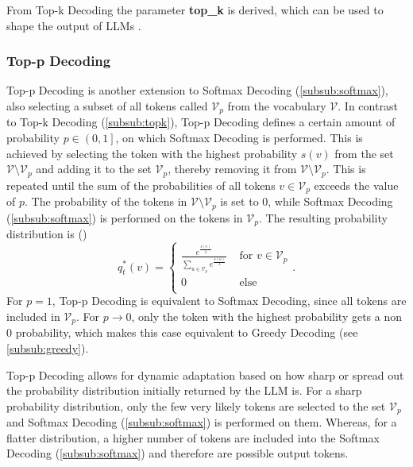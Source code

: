 \documentclass[
	fontsize = 11pt,
	paper = a4,
	draft = false,
	twoside = true,
	titlepage = false
]{scrartcl}
\numberwithin{equation}{subsection}
\begin{document}
	From Top-k Decoding the parameter \textbf{top\_k} is derived, which can be used to shape the output of \gls{LLM}s \autocite[p.~12]{llmDetail}.
	
	\subsubsection{Top-p Decoding} \label{subsub:topp}
	Top-p Decoding is another extension to Softmax Decoding (\autoref{subsub:softmax}), also selecting a subset of all \glspl{token} called $\mathcal{V}_p$ from the vocabulary $\mathcal{V}$. In contrast to Top-k Decoding (\autoref{subsub:topk}), Top-p Decoding defines a certain amount of probability $p \in \left(\right.0,1\left.\right]$, on which Softmax Decoding is performed. This is achieved by selecting the \gls{token} with the highest probability $s(v)$ from the set $\mathcal{V} \setminus \mathcal{V}_p$ and adding it to the set $\mathcal{V}_p$, thereby removing it from $\mathcal{V} \setminus \mathcal{V}_p$. This is repeated until the sum of the probabilities of all \glspl{token} $v \in \mathcal{V}_p$ exceeds the value of $p$. The probability of the \glspl{token} in $\mathcal{V}\setminus \mathcal{V}_p$ is set to $0$, while Softmax Decoding (\autoref{subsub:softmax}) is performed on the \glspl{token} in $\mathcal{V}_p$. The resulting probability distribution is (\autocite{llmDetail})
	\begin{equation}
		q_t^*(v) = \begin{cases}
			\frac{e^{\frac{s(v)}{\lambda}}}{\sum_{u \in \mathcal{V}_p}e^{\frac{s(u)}{\lambda}}} & \text{ for } v \in \mathcal{V}_p\\
			0 & \text{ else}\\
		\end{cases}.
	\end{equation}
	For $p=1$, Top-p Decoding is equivalent to Softmax Decoding, since all \glspl{token} are included in $\mathcal{V}_p$. For $p\rightarrow 0$, only the \gls{token} with the highest probability gets a non $0$ probability, which makes this case equivalent to Greedy Decoding (see \autoref{subsub:greedy}). \autocite{llmDetail}
	
	Top-p Decoding allows for dynamic adaptation based on how sharp or spread out the probability distribution initially returned by the \gls{LLM} is. For a sharp probability distribution, only the few very likely \glspl{token} are selected to the set $\mathcal{V}_p$ and Softmax Decoding (\autoref{subsub:softmax}) is performed on them. Whereas, for a flatter distribution, a higher number of \glspl{token} are included into the Softmax Decoding (\autoref{subsub:softmax}) and therefore are possible output \glspl{token}. \autocite{llmDetail}
	
\end{document}
